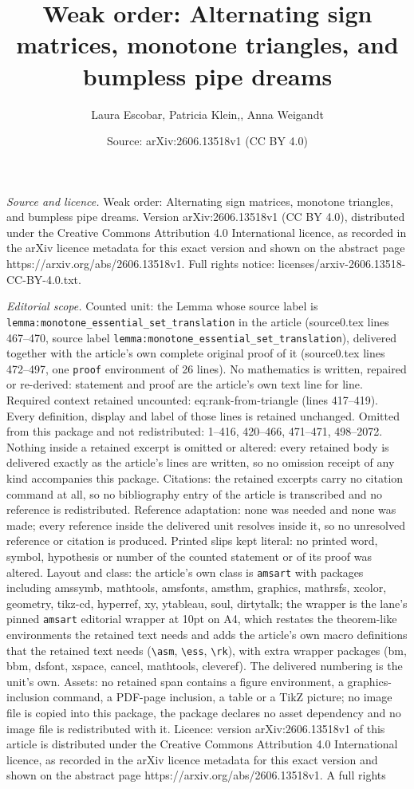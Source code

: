 \documentclass[10pt,a4paper]{amsart}
\title[Weak order: Alternating sign matrices, monotone triangles, a]{Weak order: Alternating sign matrices, monotone triangles, and bumpless pipe dreams}
\author{Laura Escobar, Patricia Klein,, Anna Weigandt}
\date{Source: arXiv:2606.13518v1 (CC BY 4.0)}
\begin{document}
\maketitle

\noindent\emph{Source and licence.} Weak order: Alternating sign matrices, monotone triangles, and bumpless pipe dreams. Version arXiv:2606.13518v1 (CC BY 4.0), distributed under the Creative Commons Attribution 4.0 International licence, as recorded in the arXiv licence metadata for this exact version and shown on the abstract page https://arxiv.org/abs/2606.13518v1. Full rights notice: licenses/arxiv-2606.13518-CC-BY-4.0.txt.\par\smallskip

\noindent\textit{Editorial scope.} Counted unit: the Lemma whose source label is \texttt{lemma:monotone\_essential\_set\_translation} in the article (source0.tex lines 467--470, source label \texttt{lemma:monotone\_essential\_set\_translation}), delivered together with the article's own complete original proof of it (source0.tex lines 472--497, one \texttt{proof} environment of 26 lines). No mathematics is written, repaired or re-derived: statement and proof are the article's own text line for line. Required context retained uncounted: eq:rank-from-triangle (lines 417--419). Every definition, display and label of those lines is retained unchanged. Omitted from this package and not redistributed: 1--416, 420--466, 471--471, 498--2072. Nothing inside a retained excerpt is omitted or altered: every retained body is delivered exactly as the article's lines are written, so no omission receipt of any kind accompanies this package. Citations: the retained excerpts carry no citation command at all, so no bibliography entry of the article is transcribed and no reference is redistributed. Reference adaptation: none was needed and none was made; every reference inside the delivered unit resolves inside it, so no unresolved reference or citation is produced. Printed slips kept literal: no printed word, symbol, hypothesis or number of the counted statement or of its proof was altered. Layout and class: the article's own class is \texttt{amsart} with packages including amssymb, mathtools, amsfonts, amsthm, graphics, mathrsfs, xcolor, geometry, tikz-cd, hyperref, xy, ytableau, soul, dirtytalk; the wrapper is the lane's pinned \texttt{amsart} editorial wrapper at 10pt on A4, which restates the theorem-like environments the retained text needs and adds the article's own macro definitions that the retained text needs (\texttt{\textbackslash asm}, \texttt{\textbackslash ess}, \texttt{\textbackslash rk}), with extra wrapper packages (bm, bbm, dsfont, xspace, cancel, mathtools, cleveref). The delivered numbering is the unit's own. Assets: no retained span contains a figure environment, a graphics-inclusion command, a PDF-page inclusion, a table or a TikZ picture; no image file is copied into this package, the package declares no asset dependency and no image file is redistributed with it. Licence: version arXiv:2606.13518v1 of this article is distributed under the Creative Commons Attribution 4.0 International licence, as recorded in the arXiv licence metadata for this exact version and shown on the abstract page https://arxiv.org/abs/2606.13518v1. A full rights 
\end{document}
